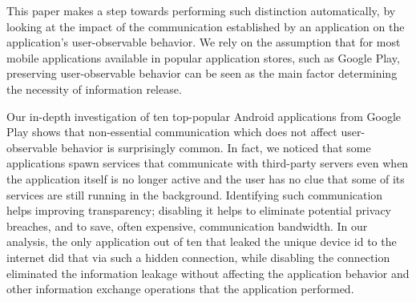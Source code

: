
This paper makes a step towards performing such distinction automatically, 
by looking at the impact of the communication established by an application on the application's user-observable behavior. 
We rely on the assumption that for most mobile applications available in popular application stores, such as Google Play, 
preserving user-observable behavior can be seen as the main factor determining the necessity of information release. 

Our in-depth investigation of ten top-popular Android applications from Google Play shows that non-essential communication which does not affect user-observable behavior is surprisingly common.
In fact, we noticed that some applications spawn services that communicate with third-party servers even when the application itself is no longer active and the user has no clue that some of its services are still running in the background. 
Identifying such communication helps improving transparency; disabling it helps to eliminate potential privacy breaches, and to save, often expensive, communication bandwidth. 
In our analysis, the only application out of ten that leaked the unique device id to the internet did that via such a hidden connection, while disabling the connection eliminated the information leakage without affecting the application behavior and other information exchange operations that the application performed.


